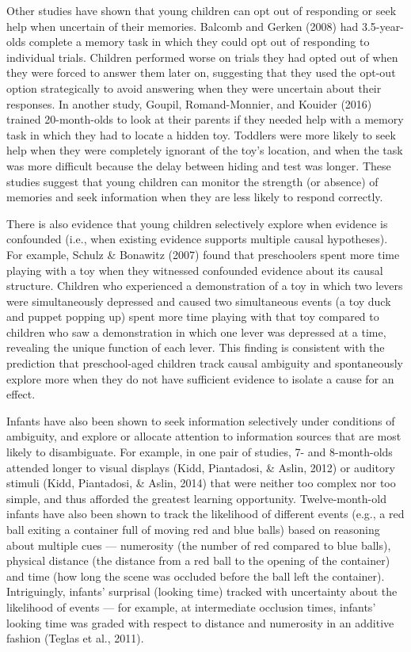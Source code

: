 \documentclass[english,,man]{apa6}
\begin{document}
Other studies have shown that young children can opt out of responding
or seek help when uncertain of their memories. Balcomb and Gerken (2008)
had 3.5-year-olds complete a memory task in which they could opt out of
responding to individual trials. Children performed worse on trials they
had opted out of when they were forced to answer them later on,
suggesting that they used the opt-out option strategically to avoid
answering when they were uncertain about their responses. In another
study, Goupil, Romand-Monnier, and Kouider (2016) trained 20-month-olds
to look at their parents if they needed help with a memory task in which
they had to locate a hidden toy. Toddlers were more likely to seek help
when they were completely ignorant of the toy's location, and when the
task was more difficult because the delay between hiding and test was
longer. These studies suggest that young children can monitor the
strength (or absence) of memories and seek information when they are
less likely to respond correctly.

There is also evidence that young children selectively explore when
evidence is confounded (i.e., when existing evidence supports multiple
causal hypotheses). For example, Schulz \& Bonawitz (2007) found that
preschoolers spent more time playing with a toy when they witnessed
confounded evidence about its causal structure. Children who experienced
a demonstration of a toy in which two levers were simultaneously
depressed and caused two simultaneous events (a toy duck and puppet
popping up) spent more time playing with that toy compared to children
who saw a demonstration in which one lever was depressed at a time,
revealing the unique function of each lever. This finding is consistent
with the prediction that preschool-aged children track causal ambiguity
and spontaneously explore more when they do not have sufficient evidence
to isolate a cause for an effect.

Infants have also been shown to seek information selectively under
conditions of ambiguity, and explore or allocate attention to
information sources that are most likely to disambiguate. For example,
in one pair of studies, 7- and 8-month-olds attended longer to visual
displays (Kidd, Piantadosi, \& Aslin, 2012) or auditory stimuli (Kidd,
Piantadosi, \& Aslin, 2014) that were neither too complex nor too
simple, and thus afforded the greatest learning opportunity.
Twelve-month-old infants have also been shown to track the likelihood of
different events (e.g., a red ball exiting a container full of moving
red and blue balls) based on reasoning about multiple cues ---
numerosity (the number of red compared to blue balls), physical distance
(the distance from a red ball to the opening of the container) and time
(how long the scene was occluded before the ball left the container).
Intriguingly, infants' surprisal (looking time) tracked with uncertainty
about the likelihood of events --- for example, at intermediate
occlusion times, infants' looking time was graded with respect to
distance and numerosity in an additive fashion (Teglas et al., 2011).
\end{document}
